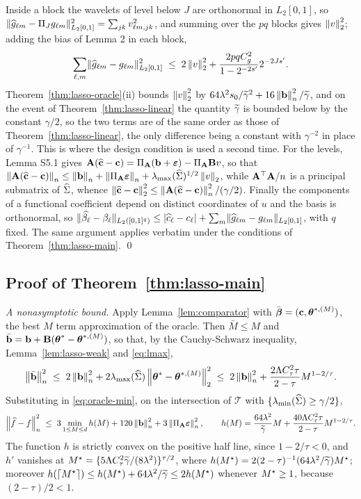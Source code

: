 Inside a block the wavelets of level below $J$ are orthonormal in $L_2[0,1]$,
so
$\lVert\widehat{g}_{\ell m}-\Pi_{J}g_{\ell m}\rVert^2_{L_2[0,1]} =
\sum_{jk}v^2_{\ell m,jk}$, and summing over the $pq$ blocks gives
$\left\lVert v \right\rVert_2^2$; adding the bias of Lemma 2 in each block,
\[
  \sum_{\ell,m}\lVert\widehat{g}_{\ell m}-g_{\ell m}
  \rVert^2_{L_2[0,1]} \;\le\; 2\left\lVert v \right\rVert_2^2
  + \frac{2pqC_g^2}{1-2^{-2s'}}2^{-2Js'} .
\]
Theorem~\ref{thm:lasso-oracle}(ii) bounds $\left\lVert v \right\rVert_2^2$ by
$64\lambda^2s_0/\widetilde{\gamma}^2+16\left\lVert \mathbf{b} \right\rVert_{n}^2/\widetilde{\gamma}$, and on the event of Theorem~\ref{thm:lasso-linear} the
quantity $\widetilde{\gamma}$ is bounded below by the constant $\gamma/2$, so the two terms
are of the same order as those of Theorem~\ref{thm:lasso-linear}, the only difference being a
constant with $\gamma^{-2}$ in place of $\gamma^{-1}$. This is where the
design condition is used a second time. For the levels, Lemma S5.1 gives
$\mathbf{A}(\widehat{\mathbf{c}}-\mathbf{c}) = \Pi_{\mathbf{A}}(\mathbf{b}+\boldsymbol{\varepsilon})-\Pi_{\mathbf{A}}\mathbf{B} v$, so that
$\left\lVert \mathbf{A}(\widehat{\mathbf{c}}-\mathbf{c}) \right\rVert_{n} \le \left\lVert \mathbf{b} \right\rVert_{n}+\left\lVert \Pi_{\mathbf{A}}\boldsymbol{\varepsilon} \right\rVert_{n}+
\lambda_{\max}(\widehat{\Sigma})^{1/2}\left\lVert v \right\rVert_2$, while $\mathbf{A}^{\top}\mathbf{A}/n$ is a principal
submatrix of $\widehat{\Sigma}$, whence
$\left\lVert \widehat{\mathbf{c}}-\mathbf{c} \right\rVert_2^2 \le \left\lVert \mathbf{A}(\widehat{\mathbf{c}}-\mathbf{c}) \right\rVert_{n}^2/(\gamma/2)$. Finally the
components of a functional coefficient depend on distinct coordinates of $u$
and the basis is orthonormal, so
$\lVert\widehat{\beta_{\ell}}-\beta_{\ell}\rVert_{L_2([0,1]^q)} \le
|\widehat{c}_{\ell}-c_{\ell}| + \sum_{m}\lVert\widehat{g}_{\ell m}-
g_{\ell m}\rVert_{L_2[0,1]}$, with $q$ fixed. The same argument applies
verbatim under the conditions of Theorem~\ref{thm:lasso-main}. \qed

\subsection*{Proof of Theorem~\ref{thm:lasso-main}}

\emph{A nonasymptotic bound.} Apply Lemma~\ref{lem:comparator} with
$\bar{\boldsymbol{\beta}} = (\mathbf{c},\boldsymbol{\theta}^{*,(M)})$, the best $M$ term approximation of the
oracle. Then $\bar M \le M$ and
$\bar{\mathbf{b}} = \mathbf{b} + \mathbf{B}(\boldsymbol{\theta}^{*}-\boldsymbol{\theta}^{*,(M)})$, so that, by the
Cauchy-Schwarz inequality, Lemma~\ref{lem:lasso-weak} and \eqref{eq:lmax},
\[
  \left\lVert \bar{\mathbf{b}} \right\rVert_{n}^2 \;\le\; 2\left\lVert \mathbf{b} \right\rVert_{n}^2
  + 2\lambda_{\max}(\widehat{\Sigma})\left\lVert \boldsymbol{\theta}^{*}-\boldsymbol{\theta}^{*,(M)} \right\rVert_2^2
  \;\le\; 2\left\lVert \mathbf{b} \right\rVert_{n}^2 + \frac{2\Lambda C_\tau^2\tau}{2-\tau}M^{1-2/\tau} .
\]
Substituting in \eqref{eq:oracle-min}, on the intersection of $\mathcal{T}$
with $\{\lambda_{\min}(\widehat{\Sigma})\ge\gamma/2\}$,
\[
  \left\lVert \widehat{f}-f \right\rVert_{n}^2 \;\le\; 3\min_{1\le M\le d}h(M)
  + 120\left\lVert \mathbf{b} \right\rVert_{n}^2 + 3\left\lVert \Pi_{\mathbf{A}}\boldsymbol{\varepsilon} \right\rVert_{n}^2,
  \qquad
  h(M) = \frac{64\lambda^2}{\widetilde{\gamma}}M
  + \frac{40\Lambda C_\tau^2\tau}{2-\tau}M^{1-2/\tau} .
\]
The function $h$ is strictly convex on the positive half line, since
$1-2/\tau<0$, and $h'$ vanishes at
$M^{\star} = \{5\Lambda C_\tau^2\widetilde{\gamma}/(8\lambda^2)\}^{\tau/2}$, where
$h(M^{\star}) = 2(2-\tau)^{-1}(64\lambda^2/\widetilde{\gamma})M^{\star}$; moreover
$h(\lceil M^{\star}\rceil) \le h(M^{\star})+64\lambda^2/\widetilde{\gamma} \le 2h(M^{\star})$ whenever
$M^{\star} \ge 1$, because $(2-\tau)/2<1$.

